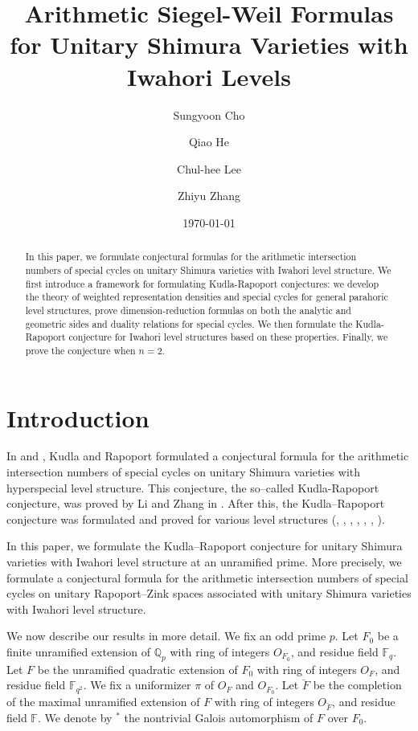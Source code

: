 \documentclass[11pt,oneside]{amsart}
\title{Arithmetic Siegel-Weil Formulas for Unitary Shimura Varieties with Iwahori Levels}
\author[Sungyoon Cho]{Sungyoon Cho}
\author[Qiao He]{Qiao He}
\author[Chul-hee Lee]{Chul-hee Lee}
\author[Zhiyu Zhang]{Zhiyu Zhang}
\date{\today}
\theoremstyle{plain}
\theoremstyle{definition}
\theoremstyle{remark}
\newcommand{\BF}{{\mathbb F}}
\newcommand{\BQ}{{\mathbb Q}}
\numberwithin{equation}{section}
\begin{document}
	\begin{abstract}
	In this paper, we formulate conjectural formulas for the arithmetic intersection numbers of special cycles on unitary Shimura varieties with Iwahori level structure. We first introduce a framework for formulating Kudla-Rapoport conjectures: we develop the theory of weighted representation densities and special cycles for general parahoric level structures, prove dimension-reduction formulas on both the analytic and geometric sides and duality relations for special cycles. We then formulate the Kudla-Rapoport conjecture for Iwahori level structures based on these properties. Finally, we prove the conjecture when $n=2$.
	\end{abstract}
	
	
	\maketitle
	
	
	\tableofcontents
	
	
	\section{Introduction}
	 
	 In \cite{KR1} and \cite{KR2}, Kudla and Rapoport formulated a conjectural formula for the arithmetic intersection numbers of special cycles on unitary Shimura varieties with hyperspecial level structure. This conjecture, the so--called Kudla-Rapoport conjecture, was proved by Li and Zhang in \cite{LZ}. After this, the Kudla--Rapoport conjecture was formulated and proved for various level structures (\cite{Cho}, \cite{LL2}, \cite{HSY3}, \cite{HLSY}, \cite{chz}, \cite{Yao}, \cite{Luo}).
	 
	 In this paper, we formulate the Kudla--Rapoport conjecture for unitary Shimura varieties with Iwahori level structure at an unramified prime. More precisely, we formulate a conjectural formula for the arithmetic intersection numbers of special cycles on unitary Rapoport--Zink spaces associated with unitary Shimura varieties with Iwahori level structure.
	 
	 We now describe our results in more detail. We fix an odd prime $p$. Let $F_0$ be a finite unramified extension of $\BQ_p$ with ring of integers $O_{F_0}$, and residue field $\BF_q$. Let $F$ be the unramified quadratic extension of $F_0$ with ring of integers $O_F$, and residue field $\BF_{q^2}$. We fix a uniformizer $\pi$ of $O_F$ and $O_{F_0}$. Let $\breve F$ be the completion of the maximal unramified extension of $F$ with ring of integers $O_{\breve{F}}$, and residue field $\BF$. We denote by $^*$ the nontrivial Galois automorphism of $F$ over $F_0$.
	 
\end{document}
